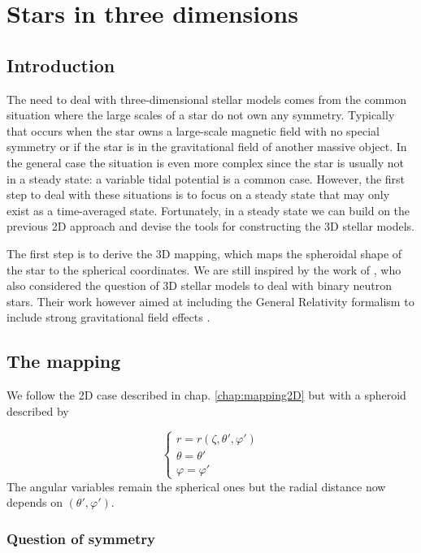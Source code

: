 \chapter{Stars in three dimensions}
\label{chap:3D}


\section{Introduction}

The need to deal with three-dimensional stellar models comes from the common
situation where the large scales of a star do not own any symmetry. Typically
that occurs when the star owns a large-scale magnetic field with no special
symmetry or if the star is in the gravitational field of another massive object.
In the general case the situation is even more complex since the star is
usually not in a steady state: a variable tidal potential is a common case.
However, the first step to deal with these situations is to focus on a steady
state that may only exist as a time-averaged state. Fortunately, in a
steady state we can build on the previous 2D approach and devise the
tools for constructing the 3D stellar models.

The first step is to derive the 3D mapping, which maps the spheroidal shape of
the star to the spherical coordinates. We are still inspired by the work of
\cite{BGM98}, who also considered the question of 3D stellar models to deal with
binary neutron stars. Their work however aimed at including the General
Relativity formalism to include strong gravitational field effects
\citep{BGM99}.

\section{The mapping}

We follow the 2D case described in chap. \ref{chap:mapping2D} but with
a spheroid described by

\begin{equation}
\left\{
\begin{array}{l}
r=r(\zeta,\theta',\varphi')\\
\theta=\theta'\\
\varphi=\varphi'
\end{array}
\right.
\label{themap3D}
\end{equation}
The angular variables remain the spherical ones but the radial distance now
depends on $(\theta',\varphi')$.

\subsection{Question of symmetry}

